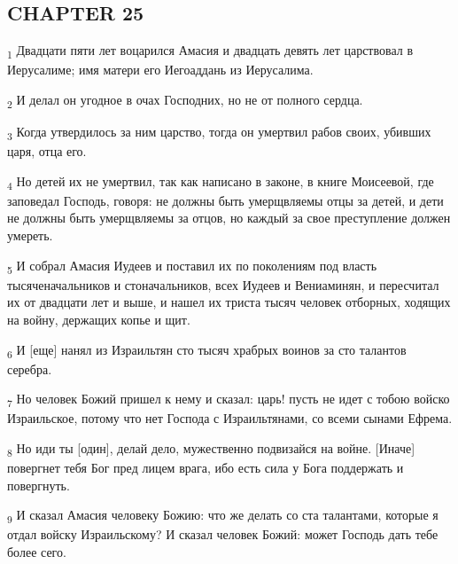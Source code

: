 \subsection{CHAPTER 25}
\begin{tcolorbox}
\textsubscript{1} Двадцати пяти лет воцарился Амасия и двадцать девять лет царствовал в Иерусалиме; имя матери его Иегоаддань из Иерусалима.
\end{tcolorbox}
\begin{tcolorbox}
\textsubscript{2} И делал он угодное в очах Господних, но не от полного сердца.
\end{tcolorbox}
\begin{tcolorbox}
\textsubscript{3} Когда утвердилось за ним царство, тогда он умертвил рабов своих, убивших царя, отца его.
\end{tcolorbox}
\begin{tcolorbox}
\textsubscript{4} Но детей их не умертвил, так как написано в законе, в книге Моисеевой, где заповедал Господь, говоря: не должны быть умерщвляемы отцы за детей, и дети не должны быть умерщвляемы за отцов, но каждый за свое преступление должен умереть.
\end{tcolorbox}
\begin{tcolorbox}
\textsubscript{5} И собрал Амасия Иудеев и поставил их по поколениям под власть тысяченачальников и стоначальников, всех Иудеев и Вениаминян, и пересчитал их от двадцати лет и выше, и нашел их триста тысяч человек отборных, ходящих на войну, держащих копье и щит.
\end{tcolorbox}
\begin{tcolorbox}
\textsubscript{6} И [еще] нанял из Израильтян сто тысяч храбрых воинов за сто талантов серебра.
\end{tcolorbox}
\begin{tcolorbox}
\textsubscript{7} Но человек Божий пришел к нему и сказал: царь! пусть не идет с тобою войско Израильское, потому что нет Господа с Израильтянами, со всеми сынами Ефрема.
\end{tcolorbox}
\begin{tcolorbox}
\textsubscript{8} Но иди ты [один], делай дело, мужественно подвизайся на войне. [Иначе] повергнет тебя Бог пред лицем врага, ибо есть сила у Бога поддержать и повергнуть.
\end{tcolorbox}
\begin{tcolorbox}
\textsubscript{9} И сказал Амасия человеку Божию: что же делать со ста талантами, которые я отдал войску Израильскому? И сказал человек Божий: может Господь дать тебе более сего.
\end{tcolorbox}
